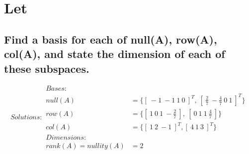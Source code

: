 \documentclass[../main.tex]{subfiles}
\begin{document}
\section[Problem 6]{Let }
\subsection{Find a basis for each of null(A), row(A), col(A), and state the dimension of each of these subspaces.}
\begin{equation*}
        \boxed{ Solutions:
                \begin{aligned}
                        Bases:                                                                                            \\
                        null(A)              & = \{[\ -1 \ -1 \ 1\ 0\ ]^T,\  [\ \frac{2}{7} \ -\frac{4}{7} \ 0 \ 1\ ]^T\} \\
                        row(A)               & = \{[\ 1 \ 0 \ 1 \ -\frac{2}{7}\ ],\ [\ 0 \ 1 \ 1 \ \frac{4}{7}\ ]\}       \\
                        col(A)               & = \{[\ 1 \ 2 \ -1\ ]^T, [\ 4 \ 1 \ 3\ ]^T\}                                \\
                        Dimensions:                                                                                       \\
                        rank(A) = nullity(A) & = 2
                \end{aligned}}
\end{equation*}
\end{document}
